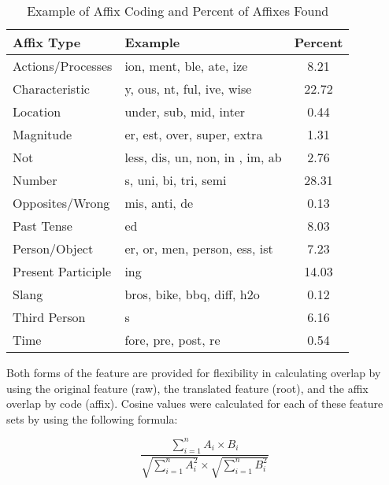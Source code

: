 \documentclass[english,,man]{apa6}
\begin{document}
\begin{table}[tbp]
\begin{center}
\begin{threeparttable}
\caption{\label{tab:affix-table}Example of Affix Coding and Percent of Affixes Found}
\begin{tabular}{llc}
\toprule
Affix Type & Example & Percent\\
\midrule
Actions/Processes & ion, ment, ble, ate, ize & 8.21\\
Characteristic & y, ous, nt, ful, ive, wise & 22.72\\
Location & under, sub, mid, inter & 0.44\\
Magnitude & er, est, over, super, extra & 1.31\\
Not & less, dis, un, non, in , im, ab & 2.76\\
Number & s, uni, bi, tri, semi & 28.31\\
Opposites/Wrong & mis, anti, de & 0.13\\
Past Tense & ed & 8.03\\
Person/Object & er, or, men, person, ess, ist & 7.23\\
Present Participle & ing & 14.03\\
Slang & bros, bike, bbq, diff, h2o & 0.12\\
Third Person & s & 6.16\\
Time & fore, pre, post, re & 0.54\\
\bottomrule
\end{tabular}
\end{threeparttable}
\end{center}
\end{table}

Both forms of the feature are provided for flexibility in calculating overlap by using the original feature (raw), the translated feature (root), and the affix overlap by code (affix). Cosine values were calculated for each of these feature sets by using the following formula:

\[
\frac{\sum_{i=1}^{n} A_i \times B_i} {\sqrt{\sum_{i=1}^{n} A_i^2} \times \sqrt{\sum_{i=1}^{n} B_i^2}}
\]
\end{document}
